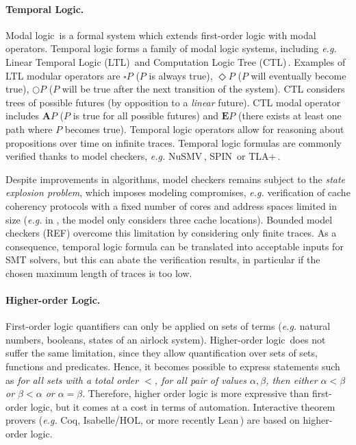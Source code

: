 \paragraph{Temporal Logic.}
%
Modal logic\,\cite{chagrov1997modal} is a formal system which extends
first-order logic with modal operators.
%
Temporal logic forms a family of modal logic systems, including \emph{e.g.}
Linear Temporal Logic (LTL)\,\cite{sistla1985ltl} and Computation Logic Tree
(CTL)\,\cite{clarke1981ctl}.
%
Examples of LTL modular operators are \( \square P \) (\( P \) is always true),
\( \Diamond P \) (\( P \) will eventually become true), \( \bigcirc P \)
(\( P \) will be true after the next transition of the system).
%
CTL considers trees of possible futures (by opposition to a \emph{linear}
future).
%
CTL modal operator includes \( \mathbf{A} P \) (\( P \) is true for all possible
futures) and \( \mathbf{E} P \) (there exists at least one path where \( P \)
becomes true).
%
Temporal logic operators allow for reasoning about propositions over time on
infinite traces.
%
Temporal logic formulas are commonly verified thanks to model checkers,
\emph{e.g.}  NuSMV\,\cite{cimatti2002nusmv}, SPIN\,\cite{holzmann1997spin} or
TLA+\,\cite{lamport2002tla}.

Despite improvements in algorithms, model checkers remains subject to the
\emph{state explosion problem}, which imposes modeling compromises, \emph{e.g.}
verification of cache coherency protocols with a fixed number of cores and
address spaces limited in size (\emph{e.g.} in \cite{lie2003xom}, the model only
considers three cache locations).
%
%
Bounded model checkers (REF) overcome this limitation by considering only finite
traces.
%
As a consequence, temporal logic formula can be translated into acceptable
inputs for SMT solvers, but this can abate the verification results, in
particular if the chosen maximum length of traces is too low.

\paragraph{Higher-order Logic.}
%
First-order logic quantifiers can only be applied on sets of terms (\emph{e.g.}
natural numbers, booleans, states of an airlock system).
%
Higher-order logic\,\cite{leivant1994hol} does not suffer the same limitation,
since they allow quantification over sets of sets, functions and predicates.
%
Hence, it becomes possible to express statements such as \emph{for all sets with
  a total order \( < \), for all pair of values \( \alpha, \beta \), then either
  \( \alpha < \beta \) or \( \beta < \alpha \) or \( \alpha = \beta \)}.
%
Therefore, higher order logic is more expressive than first-order logic, but it
comes at a cost in terms of automation.
%
Interactive theorem provers (\emph{e.g.}  Coq, Isabelle/HOL, or more recently
Lean\,\cite{de2015lean}) are based on higher-order logic.

